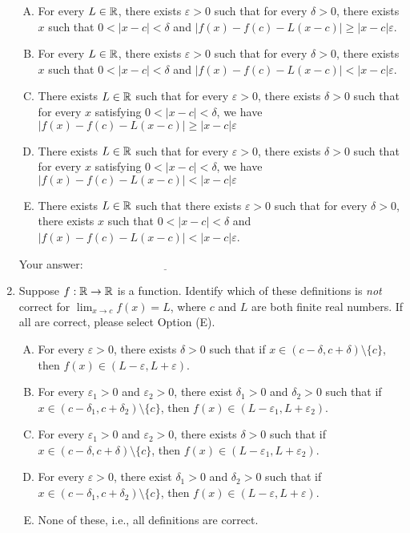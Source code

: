 \documentclass[10pt]{amsart}
\begin{document}
\begin{enumerate}
  \begin{enumerate}[(A)]
  \item For every $L \in \mathbb{R}$, there exists $\varepsilon > 0$ such that
    for every $\delta > 0$, there exists $x$ such that $0 < |x - c| <
    \delta$ and $|f(x) - f(c) - L(x - c)| \ge |x - c|\varepsilon$.
  \item For every $L \in \mathbb{R}$, there exists $\varepsilon > 0$ such that
    for every $\delta > 0$, there exists $x$ such that $0 < |x - c| <
    \delta$ and $|f(x) - f(c) - L(x - c)| < |x - c|\varepsilon$.
  \item There exists $L \in \mathbb{R}$ such that for every $\varepsilon > 0$,
  there exists $\delta > 0$ such that for every $x$ satisfying $0 < |x
  - c| < \delta$, we have $|f(x) - f(c) - L(x - c)| \ge |x - c|\varepsilon$
  \item There exists $L \in \mathbb{R}$ such that for every $\varepsilon > 0$,
  there exists $\delta > 0$ such that for every $x$ satisfying $0 < |x
  - c| < \delta$, we have $|f(x) - f(c) - L(x - c)| < |x - c|\varepsilon$
  \item There exists $L \in \mathbb{R}$ such that there exists $\varepsilon > 0$
    such that for every $\delta > 0$, there exists $x$ such that $0 <
    |x - c| < \delta$ and $|f(x) - f(c) - L(x - c)| < |x - c|\varepsilon$.
  \end{enumerate}

  \vspace{0.1in}
  Your answer: $\underline{\qquad\qquad\qquad\qquad\qquad\qquad\qquad}$
  \vspace{0.1in}

\item Suppose $f:\mathbb{R} \to \mathbb{R}$ is a function. Identify which of these
  definitions is {\em not} correct for $\displaystyle \lim_{x \to c}
  f(x) = L$, where $c$ and $L$ are both finite real numbers. If all
  are correct, please select Option (E).

  \begin{enumerate}[(A)]
  \item For every $\varepsilon > 0$, there exists $\delta > 0$ such
    that if $x \in (c - \delta, c + \delta) \setminus \{ c \}$, then
    $f(x) \in (L - \varepsilon, L + \varepsilon)$.
  \item For every $\varepsilon_1 > 0$ and $\varepsilon_2 > 0$, there exist
    $\delta_1 > 0$ and $\delta_2 > 0$ such that if $x \in (c -
    \delta_1,c+\delta_2)\setminus \{ c \}$, then $f(x) \in (L -
    \varepsilon_1, L + \varepsilon_2)$.
  \item For every $\varepsilon_1 > 0$ and $\varepsilon_2 > 0$, there exists
    $\delta > 0$ such that if $x \in (c - \delta, c + \delta)
    \setminus \{ c \}$, then $f(x) \in (L - \varepsilon_1, L + \varepsilon_2)$.
  \item For every $\varepsilon > 0$, there exist $\delta_1 > 0$ and
    $\delta_2 > 0$ such that if $x \in (c - \delta_1, c + \delta_2)
    \setminus \{ c \}$, then $f(x) \in (L - \varepsilon, L + \varepsilon)$.
  \item None of these, i.e., all definitions are correct.
  \end{enumerate}


\end{enumerate}
\end{document}

